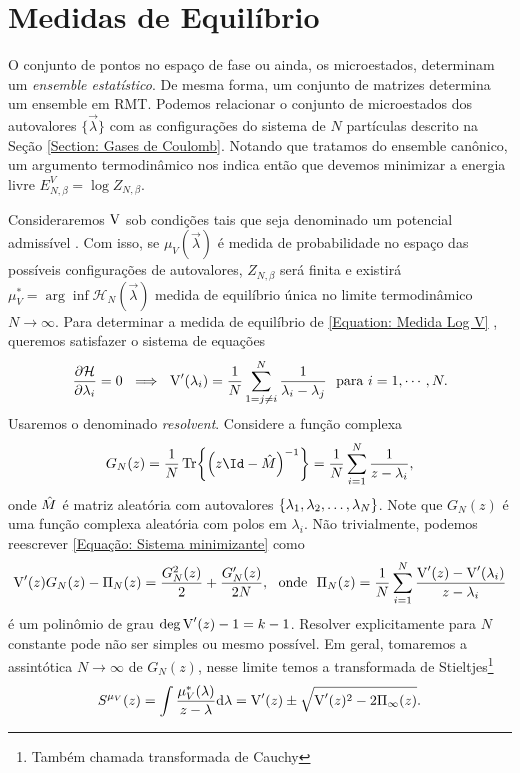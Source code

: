 \section{Medidas de Equilíbrio}
\label{Seção: Medida}
O conjunto de pontos no espaço de fase ou ainda, os microestados, determinam um \textit{ensemble estatístico}. De mesma forma, um conjunto de matrizes determina um ensemble em RMT. Podemos relacionar o conjunto de microestados dos autovalores $\{\vec{\lambda}\}$ com as configurações do sistema de $N$ partículas descrito na Seção \ref{Section: Gases de Coulomb}. Notando que tratamos do ensemble canônico, um argumento termodinâmico nos indica então que devemos minimizar a energia livre $E^V_{N,\beta} = \log{Z_{N, \beta}}.$

Consideraremos $\operatorname{V}$ sob condições tais que seja denominado um potencial admissível \cite{ChafaCoulombMeasure}. Com isso, se $\mu_{V}(\vec{\lambda})$ é medida de probabilidade no espaço das possíveis configurações de autovalores, $Z_{N, \beta}$ será finita e existirá $\mu_{V}^* = \arg \inf {\mathcal{H}_N(\vec{\lambda})}$ medida de equilíbrio única no limite termodinâmico $N \rightarrow \infty$. Para determinar a medida de equilíbrio de \ref{Equation: Medida Log V} \cite{RMT-firstcourse-Potters}, queremos satisfazer o sistema de equações
\begin{equation}
	\frac{\partial \mathcal{H}}{\partial \lambda_i} = 0 \ \implies \ \operatorname{V}'(\lambda_i) = \frac{1}{N} \sum_{1 = j \neq i}^{N} \frac{1}{\lambda_i - \lambda_j} \ \ \text{para} \ i = 1, \cdots, N.
	\label{Equação: Sistema minimizante}
\end{equation} 
Usaremos o denominado \textit{resolvent}. Considere a função complexa $$G_N(z) = \frac{1}{N} \Tr{\left(z\Id - \matriz{M}\right)^{-1}} = \frac{1}{N} \sum_{i=1}^{N} \frac{1}{z - \lambda_i},$$ onde $\hat M$ é matriz aleatória com autovalores $\{\lambda_1, \lambda_2, \dots, \lambda_N\}$. Note que $G_N(z)$ é uma função complexa aleatória com polos em $\lambda_i$. Não trivialmente, podemos reescrever \ref{Equação: Sistema minimizante} como $$\V'(z) G_N(z) - \Pi_N(z) = \frac{G_N^2(z)}{2} + \frac{G'_N(z)}{2N}, \ \ \text{onde} \ \ \Pi_N(z) = \frac{1}{N} \sum_{i = 1}^{N} \frac{\V'(z) - \V'(\lambda_i)}{z - \lambda_i}$$ é um polinômio de grau $\deg{\operatorname{V}'(z)} - 1 = k - 1$. Resolver explicitamente para $N$ constante pode não ser simples ou mesmo possível. Em geral, tomaremos a assintótica $N \to \infty$ de $G_N(z)$, nesse limite temos a transformada de Stieltjes\footnote{Também chamada transformada de Cauchy}
\begin{equation}
	S^{\mu_V}(z) = \int \frac{\mu^*_V(\lambda)}{z - \lambda} \dd \lambda= \operatorname{V}'(z) \pm \sqrt{\operatorname{V}'(z)^2 - 2 \Pi_{\infty}(z) }.
	\label{Equation: Resolvent}
\end{equation}
